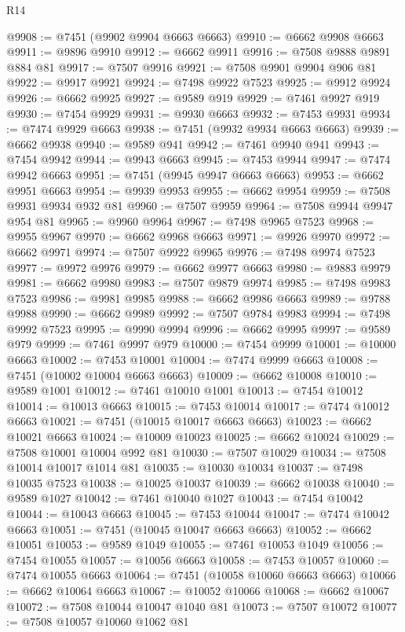 \begin{lexlean}{R14}
\begin{coremodule}
@9908 := @7451 (@9902 @9904 @6663 @6663)
@9910 := @6662 @9908 @6663
@9911 := @9896 @9910
@9912 := @6662 @9911
@9916 := @7508 @9888 @9891 @884 @81
@9917 := @7507 @9916
@9921 := @7508 @9901 @9904 @906 @81
@9922 := @9917 @9921
@9924 := @7498 @9922 @7523
@9925 := @9912 @9924
@9926 := @6662 @9925
@9927 := @9589 @919
@9929 := @7461 @9927 @919
@9930 := @7454 @9929
@9931 := @9930 @6663
@9932 := @7453 @9931
@9934 := @7474 @9929 @6663
@9938 := @7451 (@9932 @9934 @6663 @6663)
@9939 := @6662 @9938
@9940 := @9589 @941
@9942 := @7461 @9940 @941
@9943 := @7454 @9942
@9944 := @9943 @6663
@9945 := @7453 @9944
@9947 := @7474 @9942 @6663
@9951 := @7451 (@9945 @9947 @6663 @6663)
@9953 := @6662 @9951 @6663
@9954 := @9939 @9953
@9955 := @6662 @9954
@9959 := @7508 @9931 @9934 @932 @81
@9960 := @7507 @9959
@9964 := @7508 @9944 @9947 @954 @81
@9965 := @9960 @9964
@9967 := @7498 @9965 @7523
@9968 := @9955 @9967
@9970 := @6662 @9968 @6663
@9971 := @9926 @9970
@9972 := @6662 @9971
@9974 := @7507 @9922 @9965
@9976 := @7498 @9974 @7523
@9977 := @9972 @9976
@9979 := @6662 @9977 @6663
@9980 := @9883 @9979
@9981 := @6662 @9980
@9983 := @7507 @9879 @9974
@9985 := @7498 @9983 @7523
@9986 := @9981 @9985
@9988 := @6662 @9986 @6663
@9989 := @9788 @9988
@9990 := @6662 @9989
@9992 := @7507 @9784 @9983
@9994 := @7498 @9992 @7523
@9995 := @9990 @9994
@9996 := @6662 @9995
@9997 := @9589 @979
@9999 := @7461 @9997 @979
@10000 := @7454 @9999
@10001 := @10000 @6663
@10002 := @7453 @10001
@10004 := @7474 @9999 @6663
@10008 := @7451 (@10002 @10004 @6663 @6663)
@10009 := @6662 @10008
@10010 := @9589 @1001
@10012 := @7461 @10010 @1001
@10013 := @7454 @10012
@10014 := @10013 @6663
@10015 := @7453 @10014
@10017 := @7474 @10012 @6663
@10021 := @7451 (@10015 @10017 @6663 @6663)
@10023 := @6662 @10021 @6663
@10024 := @10009 @10023
@10025 := @6662 @10024
@10029 := @7508 @10001 @10004 @992 @81
@10030 := @7507 @10029
@10034 := @7508 @10014 @10017 @1014 @81
@10035 := @10030 @10034
@10037 := @7498 @10035 @7523
@10038 := @10025 @10037
@10039 := @6662 @10038
@10040 := @9589 @1027
@10042 := @7461 @10040 @1027
@10043 := @7454 @10042
@10044 := @10043 @6663
@10045 := @7453 @10044
@10047 := @7474 @10042 @6663
@10051 := @7451 (@10045 @10047 @6663 @6663)
@10052 := @6662 @10051
@10053 := @9589 @1049
@10055 := @7461 @10053 @1049
@10056 := @7454 @10055
@10057 := @10056 @6663
@10058 := @7453 @10057
@10060 := @7474 @10055 @6663
@10064 := @7451 (@10058 @10060 @6663 @6663)
@10066 := @6662 @10064 @6663
@10067 := @10052 @10066
@10068 := @6662 @10067
@10072 := @7508 @10044 @10047 @1040 @81
@10073 := @7507 @10072
@10077 := @7508 @10057 @10060 @1062 @81

\end{coremodule}
\end{lexlean}
